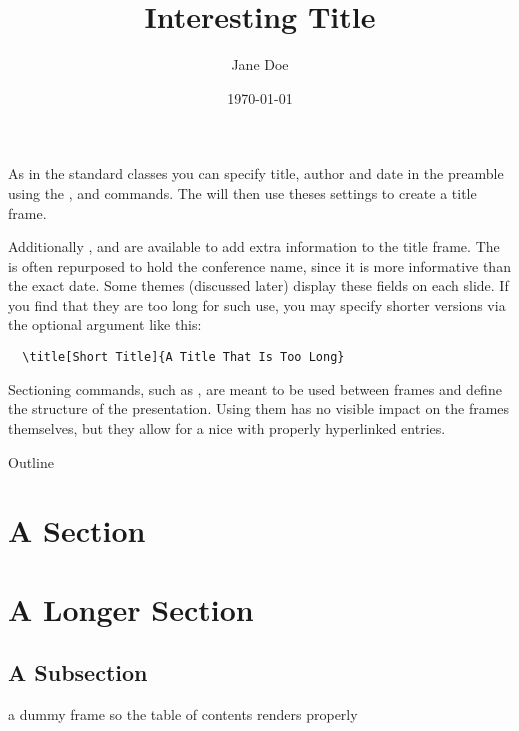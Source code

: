 As in the standard classes you can specify title, author and date in the preamble
using the ,  and  commands. The
 will then use theses settings to create a title frame.
\begin{example}
\author{Jane Doe}
\title{Interesting Title}
\date{\today}

\maketitle
\end{example}
Additionally ,  and  are
available to add extra information to the title frame. The  is often
repurposed to hold the conference name, since it is more informative than the
exact date. Some themes (discussed later) display these fields on each slide.
If you find that they are too long for such use, you may specify shorter
versions via the optional argument like this:
\begin{verbatim}
  \title[Short Title]{A Title That Is Too Long}
\end{verbatim}

Sectioning commands, such as , are meant to be used between frames
and define the structure of the presentation. Using them has no visible impact
on the frames themselves, but they allow for a  nice  with
properly hyperlinked entries.
\begin{example}
\begin{frame}{Outline}
  \tableofcontents
\end{frame}

\section{A Section}
\begin{frame}
\end{frame}
\section{A Longer Section}
\subsection{A Subsection}
\begin{frame}
  a dummy frame so the table of contents renders properly
\end{frame}
\end{example}

